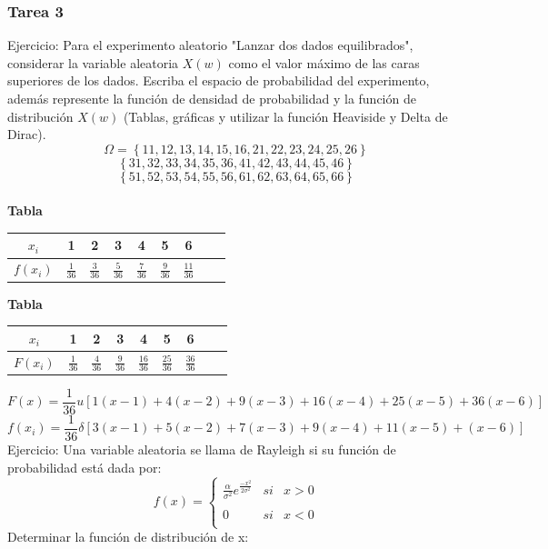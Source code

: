\documentclass[11pt,fleqn]{book} %
\numberwithin{equation}{section} %
\numberwithin{figure}{section} %
\numberwithin{table}{section} %
\begin{document}
\subsubsection{Tarea 3}
Ejercicio: Para el experimento aleatorio "Lanzar dos dados equilibrados", considerar la variable aleatoria $X(w)$ como el valor máximo de las caras superiores de los dados. Escriba el espacio de probabilidad del experimento, además represente la función de densidad de probabilidad y la función de distribución $X(w)$ (Tablas, gráficas y utilizar la función Heaviside y Delta de Dirac).
$$ \Omega = \left\{11,12,13,14,15,16,21,22,23,24,25,26 \right\} $$
$$ \left\{31,32,33,34,35,36,41,42,43,44,45,46 \right\} $$
$$ \left\{51,52,53,54,55,56,61,62,63,64,65,66 \right\} $$
\ \\%
\textbf{Tabla}
\begin{center}
\begin{tabular}{ |c|c|c|c|c|c|c|c|c| } 
 \hline
 \(x_i\) & 1 & 2 & 3 & 4 & 5 & 6  \\ 
 \hline
 \(f(x_i)\) & \( \frac{1}{36} \) & \( \frac{3}{36} \) & \( \frac{5}{36} \) & \( \frac{7}{36} \)& \( \frac{9}{36} \) & \( \frac{11}{36} \) \\ 
 \hline
\end{tabular}
\end{center}
\textbf{Tabla}
\begin{center}
\begin{tabular}{ |c|c|c|c|c|c|c|c|c| } 
 \hline
 \(x_i\) & 1 & 2 & 3 & 4 & 5 & 6  \\ 
 \hline
 \(F(x_i)\) & \( \frac{1}{36} \) & \( \frac{4}{36} \) & \( \frac{9}{36} \) & \( \frac{16}{36} \)& \( \frac{25}{36} \) & \( \frac{36}{36} \) \\ 
 \hline
\end{tabular}
\end{center}
$$F(x) =  \frac{1}{36}  u [ 1(x - 1) + 4(x - 2) + 9(x - 3) + 16(x - 4) + 25(x - 5) + 36(x - 6) ]$$
$$f(x_i) = \frac{1}{36}  \delta [ 3(x - 1) + 5(x - 2) + 7(x - 3) + 9(x - 4) + 11(x - 5) + (x - 6)]$$
Ejercicio: Una variable aleatoria se llama de Rayleigh si su función de probabilidad está dada por:
$$f(x)= \left\{ \begin{array}{lcc}
             \frac{\alpha}{\sigma^{2}} e^{\frac{-x^{2}}{2\sigma^{2}}} &   si  &  x > 0 \\
             \\ 0 &  si & x < 0 \\
               \end{array}
   \right.$$
Determinar la función de distribución de x:
\end{document}
